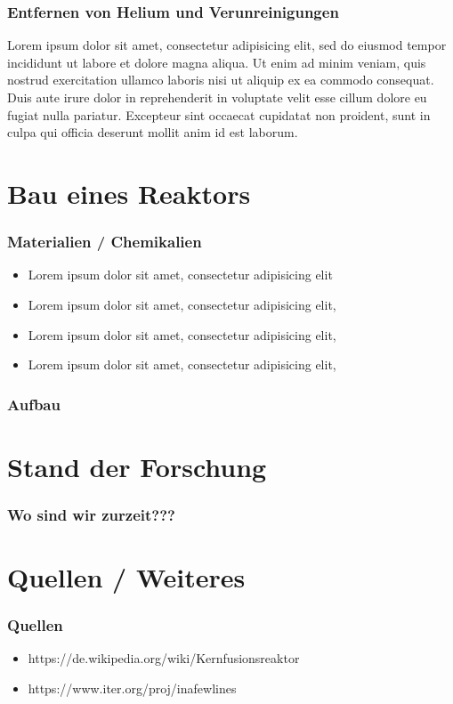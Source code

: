 \documentclass[aspectratio=169]{beamer}
\begin{document}
    \begin{frame}
      \frametitle{Entfernen von Helium und Verunreinigungen}
      Lorem ipsum dolor sit amet, consectetur adipisicing elit, sed do eiusmod tempor incididunt ut labore et dolore magna aliqua. Ut enim ad minim veniam, quis nostrud exercitation ullamco laboris nisi ut aliquip ex ea commodo consequat. Duis aute irure dolor in reprehenderit in voluptate velit esse cillum dolore eu fugiat nulla pariatur. Excepteur sint occaecat cupidatat non proident, sunt in culpa qui officia deserunt mollit anim id est laborum.
    \end{frame}

  \section{Bau eines Reaktors}

    \begin{frame}
      \frametitle{Materialien / Chemikalien}
      \begin{itemize}
        \item Lorem ipsum dolor sit amet, consectetur adipisicing elit
        \item Lorem ipsum dolor sit amet, consectetur adipisicing elit,
        \item Lorem ipsum dolor sit amet, consectetur adipisicing elit,
        \item Lorem ipsum dolor sit amet, consectetur adipisicing elit,
      \end{itemize}
    \end{frame}

    \begin{frame}
      \frametitle{Aufbau}
    \end{frame}

  \section{Stand der Forschung}

  \begin{frame}
    \frametitle{Wo sind wir zurzeit???}
  \end{frame}

  \section{Quellen / Weiteres}

    \begin{frame}
      \frametitle{Quellen}
      \begin{itemize}
        \item https://de.wikipedia.org/wiki/Kernfusionsreaktor
        \item https://www.iter.org/proj/inafewlines
      \end{itemize}
    \end{frame}
\end{document}
